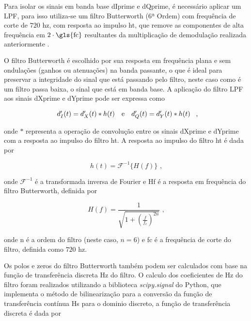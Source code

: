 Para isolar os sinais em banda base \gls{dIprime} e \gls{dQprime}, é necessário aplicar um \gls{LPF}, para isso utiliza-se um filtro Butterworth (6ª Ordem) com frequência de corte de $720$ \gls{hz}, com resposta ao impulso \gls{ht}, que remove as componentes de alta frequência em $2 \cdot \text{\gls{fc}}$ resultantes da multiplicação de demodulação realizada anteriormente \cite{rodrigues_demodulador_2018}.

O filtro Butterworth é escolhido por sua resposta em frequência plana e sem ondulações (ganhos ou atenuações) na banda passante, o que é ideal para preservar a integridade do sinal que está passando pelo filtro, neste caso como é um filtro passa baixa, o sinal que está em banda base. A aplicação do filtro \gls{LPF} aos sinais \gls{dXprime} e \gls{dYprime} pode ser expressa como

\vspace{-1em}
\begin{equation}
    \begin{array}{c@{\quad\text{e}\quad}c}
        d_I'(t) = d_X'(t) * h(t) &
        d_Q'(t) = d_Y'(t) * h(t)
    \end{array} \text{ ,}
\end{equation}

\noindent onde $*$ representa a operação de convolução entre os sinais \gls{dXprime} e \gls{dYprime} com a resposta ao impulso do filtro \gls{ht}. A resposta ao impulso do filtro \gls{ht} é dada por

\vspace{-1em}
\begin{equation}
    h(t) = \mathcal{F}^{-1}\{H(f)\} \text{ ,}
\end{equation}

\noindent onde $\mathcal{F}^{-1}$ é a transformada inversa de Fourier e \gls{Hf} é a resposta em frequência do filtro Butterworth, definida por

\vspace{-1em}
\begin{equation}
    H(f) = \frac{1}{\sqrt{1 + \left(\frac{f}{f_c}\right)^{2n}}} \text{ ,}
\end{equation}

\noindent onde \gls{n} é a ordem do filtro (neste caso, $n=6$) e \gls{fc} é a frequência de corte do filtro, definida como $720$ \gls{hz}. 


Os polos e zeros do filtro Butterworth também podem ser calculados com base na função de transferência discreta \gls{Hz} do filtro. O calculo dos coeficientes de \gls{Hz} do filtro foram realizados utilizando a biblioteca \textit{scipy.signal} do Python, que implementa o método de bilinearização para a conversão da função de transferência contínua \gls{Hs} para o dominio discreto, a função de transferência discreta é dada por

